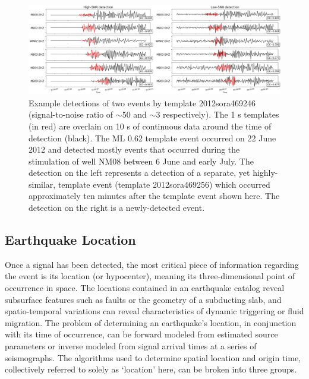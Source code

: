 \begin{figure}[h!]
\begin{center}
\includegraphics[width=0.98\columnwidth]{Chapter_2_Data/figures/det_example_publication/det_example_publication}
\caption[High and low signal-to-noise ratio detections]{{
Example detections of two events by template 2012sora469246
(signal-to-noise ratio of $\sim$50 and $\sim$3
respectively). The 1 s templates (in red) are overlain on 10 s of
continuous data around the time of detection (black). The ML 0.62
template event occurred on 22 June 2012 and detected mostly events that
occurred during the \gls{stimulation} of well NM08 between 6 June and early
July. The detection on the left represents a detection of a separate,
yet highly-similar, template event (template 2012sora469256) which
occurred approximately ten minutes after the template event shown here.
The detection on the right is a newly-detected event.
{\label{249518}}%
}}
\end{center}
\end{figure}

\subsection{Earthquake Location}
Once a signal has been detected, the most critical piece of information regarding the event is its location (or hypocenter), meaning its three-dimensional point of occurrence in space. The locations contained in an earthquake catalog reveal subsurface features such as faults or the geometry of a subducting slab, and spatio-temporal variations can reveal characteristics of dynamic triggering or fluid migration. The problem of determining an earthquake's location, in conjunction with its time of occurrence, can be forward modeled from estimated source parameters or inverse modeled from signal arrival times at a series of seismographs. The algorithms used to determine spatial location and origin time, collectively referred to solely as `location' here, can be broken into three groups.


